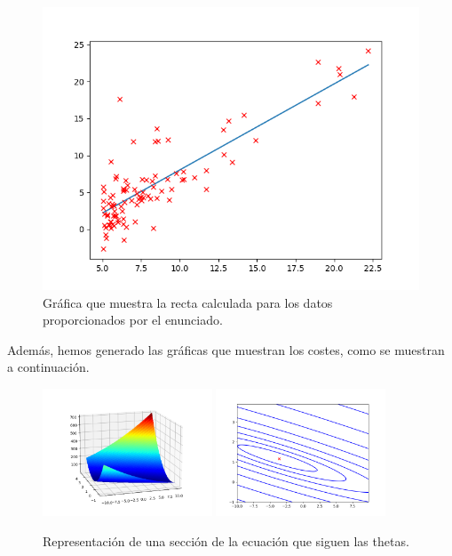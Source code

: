 \documentclass[11pt]{article}
\begin{document}
 \begin{figure}[h!]
    \begin{center}
    \includegraphics[width=\textwidth]{Imagenes/gradiantDescenseResult.png}
    \caption{Gráfica que muestra la recta calculada para los datos proporcionados por el enunciado.}
    \label{fig:Gráfica que muestra la recta calculada para los datos proporcionados por el enunciado.}
    \end{center}
 \end{figure}
Además, hemos generado las gráficas que muestran los costes, como se muestran a continuación.

 \begin{figure}[h!]
    \begin{center}
    \includegraphics[width=0.45\textwidth]{Imagenes/costMap.png}
    \includegraphics[width=0.45\textwidth]{Imagenes/costMap2.png}
    \caption{Representación de una sección de la ecuación que siguen las thetas.}
    \label{fig:Representación de una sección de la ecuación que siguen las thetas.}
    \end{center}
 \end{figure}
\end{document}
